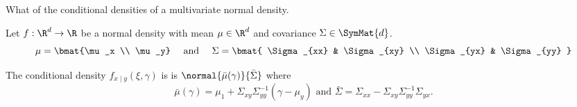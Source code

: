 

What of the conditional densities of a multivariate normal density.


\begin{prop}

Let $f: \R^d \to \R$ be a normal density with mean $\mu \in \R^d$ and covariance $\Sigma \in \SymMat{d}$.
\[
  \mu = \bmat{\mu_x \\ \mu_y} \quad \text{ and } \quad
  \Sigma = \bmat{
    \Sigma_{xx} & \Sigma_{xy} \\
    \Sigma_{yx} & \Sigma_{yy}
  }
\]

The conditional density $f_{x \mid y}(\xi, \gamma)$ is is $\normal{\bar{\mu}(\gamma)}{\bar{\Sigma}}$ where
  \[
    \bar{\mu}(\gamma) = \mu_1 + \Sigma_{xy}\Sigma_{yy}^{-1}(\gamma - \mu_y) \text{ and } \bar{\Sigma} = \Sigma_{xx} - \Sigma_{xy}\Sigma_{yy}^{-1}\Sigma_{yx}.
  \]
\end{prop}

\blankpage
